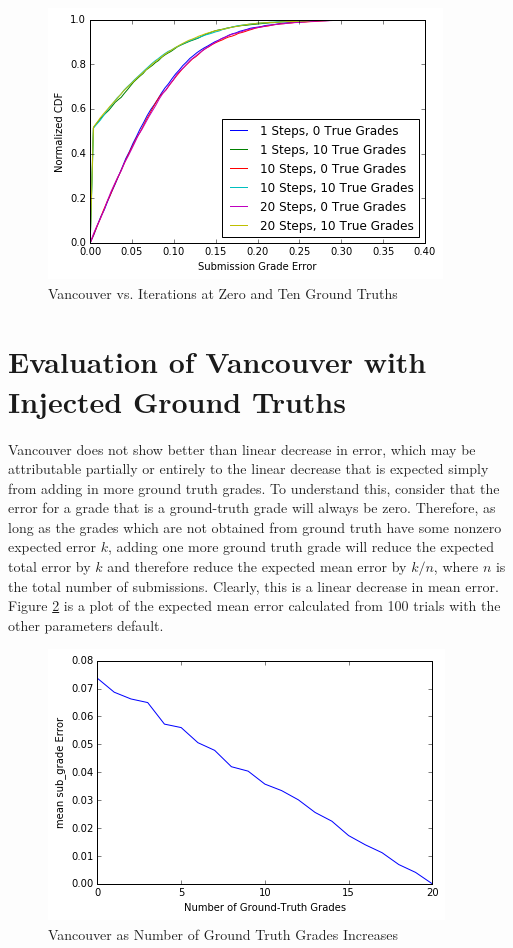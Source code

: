 \documentclass{article}
\begin{document}
	\begin{figure}[h]
		\includegraphics{vancouver-vs-iterations-2.png}
		\caption{Vancouver vs. Iterations at Zero and Ten Ground Truths}
		\label{fig:vancouver-vs-iterations-2}
	\end{figure}
	

	\section{Evaluation of Vancouver with Injected Ground Truths}
	Vancouver does not show better than linear decrease in error, which may be attributable partially or entirely to the linear decrease that is expected simply from adding in more ground truth grades. To understand this, consider that the error for a grade that is a ground-truth grade will always be zero. Therefore, as long as the grades which are not obtained from ground truth have some nonzero expected error $k$, adding one more ground truth grade will reduce the expected total error by $k$ and therefore reduce the expected mean error by $k/n$, where $n$ is the total number of submissions. Clearly, this is a linear decrease in mean error. Figure \ref{fig:vancouver-vs-ground-truth-cover} is a plot of the expected mean error calculated from 100 trials with the other parameters default.
	
	\begin{figure}[h]
		\includegraphics{vancouver-vs-ground-truth-cover.png}
		\caption{Vancouver as Number of Ground Truth Grades Increases}
		\label{fig:vancouver-vs-ground-truth-cover}
	\end{figure}
	
\end{document}
